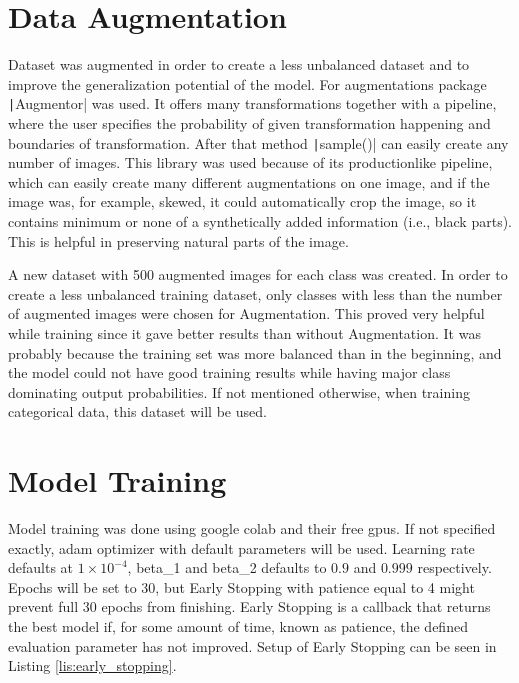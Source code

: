 \documentclass[thesis=B,english]{FITthesis}[2019/12/23]
\begin{document}
\section{Data Augmentation}
Dataset was augmented in order to create a less unbalanced dataset and to improve the generalization potential of the model. For augmentations package \texttt|Augmentor| \cite{augmentor} was used. It offers many transformations together with a pipeline, where the user specifies the probability of given transformation happening and boundaries of transformation. After that method \texttt|sample()| can easily create any number of images. This library was used because of its productionlike pipeline, which can easily create many different augmentations on one image, and if the image was, for example, skewed, it could automatically crop the image, so it contains minimum or none of a synthetically added information (i.e., black parts). This is helpful in preserving natural parts of the image. 

A new dataset with 500 augmented images for each class was created. In order to create a less unbalanced training dataset, only classes with less than the number of augmented images were chosen for Augmentation. This proved very helpful while training since it gave better results than without Augmentation. It was probably because the training set was more balanced than in the beginning, and the model could not have good training results while having major class dominating output probabilities. If not mentioned otherwise, when training categorical data, this dataset will be used. 

\section{Model Training}
Model training was done using google colab and their free \gls{gpu}s. If not specified exactly, adam optimizer with default parameters will be used. Learning rate defaults at $1 \times 10^{-4}$, beta\_1 and beta\_2 defaults to $0.9$ and $0.999$ respectively. Epochs will be set to 30, but Early Stopping with patience equal to 4 might prevent full 30 epochs from finishing. Early Stopping is a callback that returns the best model if, for some amount of time, known as patience, the defined evaluation parameter has not improved. Setup of Early Stopping can be seen in Listing \ref{lis:early_stopping}.
\end{document}
